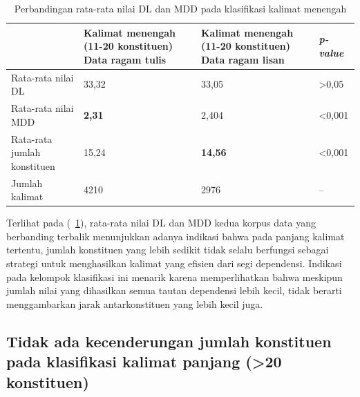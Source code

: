 \begin{table}
\begin{center}
\begin{small}
 \caption{Perbandingan rata-rata nilai DL dan MDD pada klasifikasi kalimat menengah}\label{tab:DL_MDD_menengah}  
 \begin{tabular}{| p{3.2cm} | p{3.2cm} | p{3.2cm} | p{2cm} |}
    \hline
 & Kalimat menengah \newline (11-20 konstituen) \newline Data ragam tulis & Kalimat menengah \newline (11-20 konstituen) \newline Data ragam lisan & \textit{p-value} \\ \hline
 Rata-rata nilai DL & 33,32 & 33,05 & \textgreater 0,05  \\ \hline
 Rata-rata nilai MDD & \textbf{2,31} & 2,404 & \textless 0,001 \\ \hline
 Rata-rata jumlah konstituen & 15,24 & \textbf{14,56} & \textless 0,001 \\ \hline
 Jumlah kalimat & 4210 & 2976 & -- \\ \hline
   \end{tabular}
   \end{small}
\end{center}
\end{table}

Terlihat pada (\tab~\ref{tab:DL_MDD_menengah}), rata-rata nilai DL dan MDD kedua korpus data yang berbanding terbalik menunjukkan adanya indikasi bahwa pada panjang kalimat tertentu, jumlah konstituen yang lebih sedikit tidak selalu berfungsi sebagai strategi untuk menghasilkan kalimat yang efisien dari segi dependensi. Indikasi pada kelompok klasifikasi ini menarik karena memperlihatkan bahwa meskipun jumlah nilai yang dihasilkan semua tautan dependensi lebih kecil, tidak berarti menggambarkan jarak antarkonstituen yang lebih kecil juga.

\subsection{Tidak ada kecenderungan jumlah konstituen pada klasifikasi kalimat panjang (\textgreater20 konstituen)}

